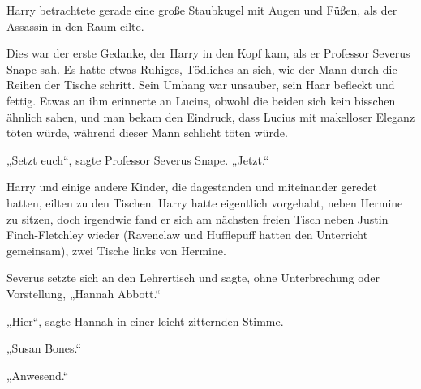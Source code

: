 Harry betrachtete gerade eine große Staubkugel mit Augen und Füßen, als der Assassin in den Raum eilte. 

Dies war der erste Gedanke, der Harry in den Kopf kam, als er Professor Severus Snape sah. Es hatte etwas Ruhiges, Tödliches an sich, wie der Mann durch die Reihen der Tische schritt. Sein Umhang war unsauber, sein Haar befleckt und fettig. Etwas an ihm erinnerte an Lucius, obwohl die beiden sich kein bisschen ähnlich sahen, und man bekam den Eindruck, dass Lucius mit makelloser Eleganz töten würde, während dieser Mann schlicht töten würde. 

„Setzt euch“, sagte Professor Severus Snape. „Jetzt.“ 

Harry und einige andere Kinder, die dagestanden und miteinander geredet hatten, eilten zu den Tischen. Harry hatte eigentlich vorgehabt, neben Hermine zu sitzen, doch irgendwie fand er sich am nächsten freien Tisch neben Justin Finch-Fletchley wieder (Ravenclaw und Hufflepuff hatten den Unterricht gemeinsam), zwei Tische links von Hermine. 

Severus setzte sich an den Lehrertisch und sagte, ohne Unterbrechung oder Vorstellung, „Hannah Abbott.“ 

„Hier“, sagte Hannah in einer leicht zitternden Stimme. 

„Susan Bones.“ 

„Anwesend.“ 

